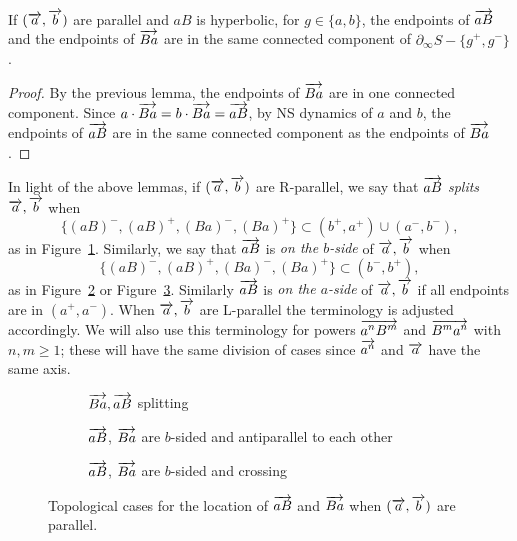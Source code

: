 \begin{lemma}
If $(\overrightarrow{a},\overrightarrow{b})$ are parallel and $aB$ is hyperbolic, for $g \in \{ a, b \}$, the
endpoints of $\overrightarrow{aB}$ and the endpoints of $\overrightarrow{Ba}$ are in the
same connected component of $\partial_\infty S - \{ g^+,g^-\}$.
\label{lem:aB_Ba_together}
\end{lemma}
\begin{proof}
  By the previous lemma, the endpoints of $\overrightarrow{Ba}$ are in one
  connected component.
  Since $a \cdot \overrightarrow{Ba} = b \cdot \overrightarrow{Ba} = \overrightarrow{aB}$, by NS dynamics of $a$ and $b$,
the endpoints of $\overrightarrow{aB}$ are in the same connected component as the
endpoints of $\overrightarrow{Ba}$.
\end{proof}


In light of the above lemmas, if $(\overrightarrow{a},\overrightarrow{b})$ are R-parallel,
  we say that $\overrightarrow{aB}$ \emph{splits}
$\overrightarrow{a}, \overrightarrow{b}$ when
\[
\bigl\{(aB)^-,(aB)^+,(Ba)^-,(Ba)^+\bigr\} \subset (b^+,a^+) \cup (a^-,b^-),
\]
as in Figure~\ref{fig:r3}.
Similarly, we say that $\overrightarrow{aB}$ is \emph{on the $b$-side} of
$\overrightarrow{a},\overrightarrow{b}$ when
\[
\bigl\{(aB)^-,(aB)^+,(Ba)^-,(Ba)^+\bigr\} \subset (b^-,b^+),
\]
as in Figure~\ref{fig:r1} or Figure~\ref{fig:c2}.
Similarly $\overrightarrow{aB}$ is \emph{on the $a$-side} of $\overrightarrow{a},\overrightarrow{b}$ if
all endpoints are in $(a^+,a^-)$. When $\overrightarrow{a},\overrightarrow{b}$ are L-parallel
the terminology is adjusted accordingly. We will also use this
terminology for powers $\overrightarrow{a^n B^m}$ and $\overrightarrow{B^m a^n}$ with
$n,m \ge 1$; these will
have the same division of cases since $\overrightarrow{a^n}$ and $\overrightarrow{a}$ have
the same axis.

\begin{figure}
  \centering
  \setlength{\abovecaptionskip}{3pt}
  \setlength{\belowcaptionskip}{0pt}

  \begin{subfigure}[t]{0.42\textwidth}
    \centering
    \caption{$\protect\overrightarrow{Ba},\protect\overrightarrow{aB}$ splitting}
    \label{fig:r3}
  \end{subfigure}
  \hfill
 \begin{subfigure}[t]{0.42\textwidth}
    \centering
    \caption{$\protect\overrightarrow{aB}$, $\protect\overrightarrow{Ba}$ are $b$-sided and antiparallel to each other}
    \label{fig:r1}
  \end{subfigure}
  \vspace{10pt}\par
  \begin{subfigure}[t]{0.42\textwidth}
    \centering
    \caption{$\protect\overrightarrow{aB}$, $\protect\overrightarrow{Ba}$ are $b$-sided and crossing}
    \label{fig:c2}
  \end{subfigure}

  \caption{Topological cases for the location of $\protect\overrightarrow{aB}$ and
    $\protect\overrightarrow{Ba}$ when $(\protect\overrightarrow{a},\protect\overrightarrow{b})$ are parallel.}
  \label{fig:cases-conn-smoothing}
\end{figure}

